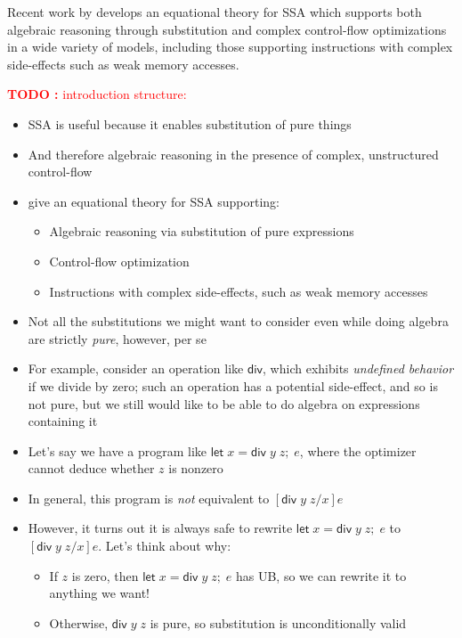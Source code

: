 \documentclass[acmsmall,screen,review]{acmart}
\newcounter{todos}
\newcommand{\TODO}[1]{{
  \stepcounter{todos}
  \begin{center}\large{\textcolor{red}{\textbf{TODO \arabic{todos}:} #1}}\end{center}
}}
\newcommand{\ms}[1]{\ensuremath{\mathsf{#1}}}
\newcommand{\letexpr}[3]{\ensuremath{\ms{let}\;#1 = #2;\;#3}}
\begin{document}
Recent work by \citet{ghalayini-24-ssa-densem-arxiv} develops an equational theory for SSA which
supports both algebraic reasoning through substitution and complex control-flow optimizations in
a wide variety of models, including those supporting instructions with complex side-effects such
as weak memory accesses. 

\TODO{introduction structure:}

\begin{itemize}
  \item SSA is useful because it enables substitution of pure things
  \item And therefore algebraic reasoning in the presence of complex, unstructured control-flow
  \item \citet{ghalayini-24-ssa-densem-arxiv} give an equational theory for SSA supporting:
  \begin{itemize}
    \item Algebraic reasoning via substitution of pure expressions
    \item Control-flow optimization
    \item Instructions with complex side-effects, such as weak memory accesses
  \end{itemize}
  \item Not all the substitutions we might want to consider even while doing algebra are strictly
  \emph{pure}, however, per se
  \item For example, consider an operation like \ms{div}, which exhibits \emph{undefined behavior}
  if we divide by zero; such an operation has a potential side-effect, and so is not pure, but we
  still would like to be able to do algebra on expressions containing it
  \item Let's say we have a program like $\letexpr{x}{\ms{div}\;y\;z}{e}$, where the optimizer
  cannot deduce whether $z$ is nonzero
  \item In general, this program is \emph{not} equivalent to $[\ms{div}\;y\;z/x]e$
  \item However, it turns out it is always safe to rewrite $\letexpr{x}{\ms{div}\;y\;z}{e}$ to
  $[\ms{div}\;y\;z/x]e$. Let's think about why:
  \begin{itemize}
    \item If $z$ is zero, then $\letexpr{x}{\ms{div}\;y\;z}{e}$ has UB, so we can rewrite it to
    anything we want!
    \item Otherwise, $\ms{div}\;y\;z$ is pure, so substitution is unconditionally valid
  \end{itemize}

\end{itemize}
\end{document}
